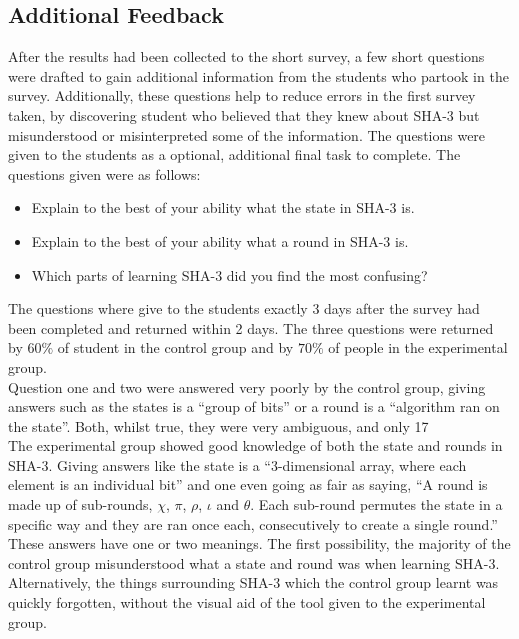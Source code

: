 \subsection{Additional Feedback}
After the results had been collected to the short survey, a few short questions were drafted to gain additional information from the students who partook in the survey. Additionally, these questions help to reduce errors in the first survey taken, by discovering student who believed that they knew about SHA-3 but misunderstood or misinterpreted some of the information. The questions were given to the students as a optional, additional final task to complete. The questions given were as follows:
\begin{itemize}
\item Explain to the best of your ability what the state in SHA-3 is.
\item Explain to the best of your ability what a round in SHA-3 is.
\item Which parts of learning SHA-3 did you find the most confusing?
\end{itemize}
The questions where give to the students exactly 3 days after the survey had been completed and returned within 2 days. The three questions were returned by $60\%$ of student in the control group and by $70\%$ of people in the experimental group. 
\vspace{5mm}\\
Question one and two were answered very poorly by the control group, giving answers such as the states is a ``group of bits'' or a round is a ``algorithm ran on the state''. Both, whilst true, they were very ambiguous, and only 17%
\vspace{5mm}\\
The experimental group showed good knowledge of both the state and rounds in SHA-3. Giving answers like the state is a ``3-dimensional array, where each element is an individual bit'' and one even going as fair as saying, ``A round is made up of sub-rounds, $\chi$, $\pi$, $\rho$, $\iota$ and $\theta$. Each sub-round permutes the state in a specific way and they are ran once each, consecutively to create a single round.''
\vspace{5mm}\\
These answers have one or two meanings. The first possibility, the majority of the control group misunderstood what a state and round was when learning SHA-3. Alternatively, the things surrounding SHA-3 which the control group learnt was quickly forgotten, without the visual aid of the tool given to the experimental group.
